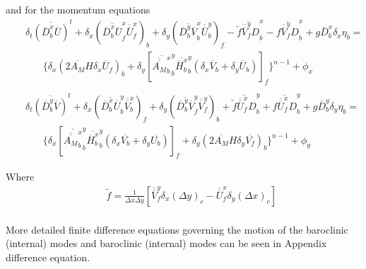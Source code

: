 \documentclass[oribibl]{llncs}
\begin{document}
and for the momentum equations
\begin{eqnarray}
&&\delta_t \overline{(\overline{D}^x_b \overline{U})}^t + \delta_x (\overline{\overline{D}^x_b \overline{U}}^x_f \overline{\overline{U}}^x_f)_b +  \delta_y (\overline{\overline{D}^y_b \overline{V}}^x_b \overline{\overline{U}}^y_b)_f - \overline {\tilde{f}\overline {\overline {V}}^y_f D}^x_b - \overline{f \overline{\overline{V}}^y_f D}^x_b + g\overline{D}^x_b \delta_x \eta_b = \nonumber \\
&&\ \ \ \ \ \ \ \  \{\delta_x (2 \overline {A_M}H\delta_x \overline{U}_f)_b+\delta_y [ \overline{ \overline {\overline{A_M}}^x_b }^y_b \overline {\overline{H}^x_b }^y_b (\delta_x \overline{V}_b + \delta_y \overline{U}_b)]_f\}^{n-1} + \phi_x  \\
\nonumber \\
&&\delta_t \overline{(\overline{D}^y_b \overline{V})}^t + \delta_x (\overline{\overline{D}^x_b \overline{U}}^y_b \overline{\overline{V}}^x_b)_f +  \delta_y (\overline{\overline{D}^y_b \overline{V}}^y_f \overline{\overline{V}}^y_f)_b + \overline{ \tilde {f}\overline{\overline{U}}^x_f D}^y_b + \overline{f \overline{\overline{U}}^x_f D}^y_b + g\overline{D}^y_b \delta_y \eta_b = \nonumber \\
&&\ \ \ \ \ \ \ \  \{\delta_x [ \overline{ \overline {\overline {A_M}}^x_b }^y_b \overline {\overline{H}^x_b }^y_b (\delta_x \overline{V_b} + \delta_y \overline {U_b})]_f + \delta_y (2 \overline{A_M}H\delta_y \overline{V_f})_b \}^{n-1} + \phi_y
 \end{eqnarray}

Where
\begin{eqnarray}
&&\tilde {f} = \frac{1}{\Delta x \Delta y} [ \overline {\overline {V}}^y_f \delta_x(\Delta y)_c - \overline {\overline {U}}^x_f \delta_y(\Delta x)_c ]
\end{eqnarray} 
\\ \nonumber
More detailed finite difference equations governing the motion of the baroclinic (internal) modes and baroclinic (internal) modes can be seen in Appendix difference equation.

 
\end{document}
